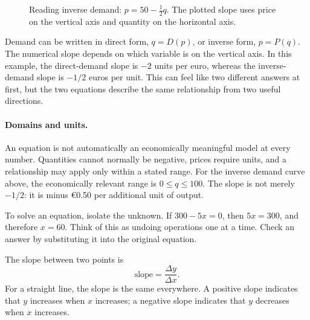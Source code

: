 \begin{figure}[!ht]
\centering
{}
\caption{Reading inverse demand: $p=50-\frac{1}{2}q$. The plotted slope
uses price on the vertical axis and quantity on the horizontal axis.}
\label{fig:inverse-demand-toolkit}
\end{figure}

Demand can be written in direct form, $q=D(p)$, or inverse form, $p=P(q)$.
The numerical slope depends on which variable is on the vertical axis. In
this example, the direct-demand slope is $-2$ units per euro, whereas the
inverse-demand slope is $-1/2$ euros per unit. This can feel like two
different answers at first, but the two equations describe the same
relationship from two useful directions.

\paragraph{Domains and units.} An equation is not automatically an
economically meaningful model at every number. Quantities cannot normally be
negative, prices require units, and a relationship may apply only within a
stated range. For the inverse demand curve above, the economically relevant
range is $0\leq q\leq100$. The slope is not merely $-1/2$: it is minus
\euro0.50 per additional unit of output.

To solve an equation, isolate the unknown. If $300-5x=0$, then $5x=300$, and
therefore $x=60$. Think of this as undoing operations one at a time. Check an
answer by substituting it into the original equation.

The slope between two points is
\[
\text{slope}=\frac{\Delta y}{\Delta x}.
\]
For a straight line, the slope is the same everywhere. A positive slope indicates that $y$ increases when $x$ increases; a negative slope indicates that $y$ decreases when $x$ increases.

